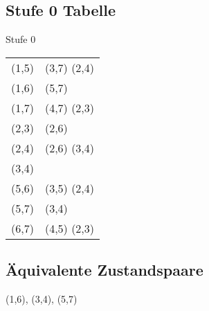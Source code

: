 \documentclass[ngerman,12pt,parskip=half]{scrartcl}
\begin{document}
\subsection{Stufe 0 Tabelle}

Stufe 0 \\
\begin{tabular}{c|l}  \hline
	(1,5) & (3,7) (2,4) \\
	(1,6) & (5,7)  \\
	(1,7) & (4,7) (2,3) \\
	(2,3) & (2,6)  \\
	(2,4) & (2,6) (3,4) \\
	(3,4) &    \\
	(5,6) & (3,5) (2,4) \\
	(5,7) & (3,4)  \\
	(6,7) & (4,5) (2,3) \\
\end{tabular}

\subsection{Äquivalente Zustandspaare}

(1,6), (3,4), (5,7)
\end{document}
